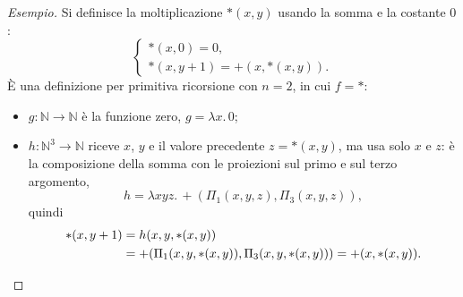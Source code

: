 \documentclass[a4paper, 11pt, oneside]{book}
\theoremstyle{formale}
\newenvironment{esempio}
    {\begin{proof}[\textit{Esempio}]\renewcommand{\qedsymbol}{$\diamond$}}
    {\end{proof}}
\begin{document}
    \begin{esempio}
        Si definisce la moltiplicazione ${*}(x, y)$ usando la somma e la costante $0$:
        \begin{equation*}
            \begin{cases}
                {*}(x, 0) = 0, \\
                {*}(x, y + 1) = {+}(x, {*}(x, y)).
            \end{cases}
        \end{equation*}
        \`E una definizione per primitiva ricorsione con $n = 2$, in cui $f = {*}$:
        \begin{itemize}
            \item $g \colon \mathbb{N} \to \mathbb{N}$ \`e la funzione zero,
                $g = \lambda x.\, 0$;
            \item $h \colon \mathbb{N}^3 \to \mathbb{N}$ riceve $x$, $y$ e il valore
                precedente $z = {*}(x, y)$, ma usa solo $x$ e $z$: \`e la composizione
                della somma con le proiezioni sul primo e sul terzo argomento,
                \begin{equation*}
                    h = \lambda x y z.\, {+}(\Pi_1(x, y, z), \Pi_3(x, y, z)),
                \end{equation*}
                quindi
                \begin{align*}
                    {*}(x, y + 1) &= h(x, y, {*}(x, y)) \\
                    &= {+}(\Pi_1(x, y, {*}(x, y)), \Pi_3(x, y, {*}(x, y)))
                    = {+}(x, {*}(x, y)).\qedhere
                \end{align*}
        \end{itemize}
    \end{esempio}
\end{document}
